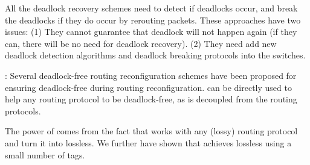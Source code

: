 All the deadlock recovery schemes
\cite{isca95,shpiner2016unlocking,venkatramani1996,martinez1997,Lopez1998}
need to detect if deadlocks occur, and break the deadlocks if they do
occur by rerouting packets. These approaches have two issues: (1) They
cannot guarantee that deadlock will not happen again (if they can,
there will be no need for deadlock recovery). (2) They need add new
deadlock detection algorithms and deadlock breaking protocols into the
switches.


:
Several deadlock-free routing reconfiguration schemes
\cite{automatic,lysne2005,doublescheme,gara2005} have been proposed for
ensuring deadlock-free during routing reconfiguration. \sysname{} can
be directly used to help any routing protocol to be deadlock-free, as
\sysname{} is decoupled from the routing protocols.


The power of \sysname{} comes from the fact that \sysname{} works with
any (lossy) routing protocol and turn it into lossless. We further have
shown that \sysname{} achieves lossless using a small number of tags.



